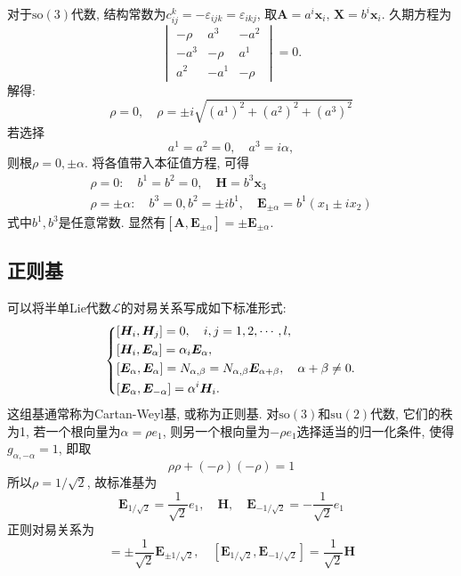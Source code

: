 \documentclass[UTF8]{ctexart}
\begin{document}
对于$\mathrm{so}(3)$代数, 结构常数为$c_{ij}^k = - \varepsilon_{ijk} = \varepsilon_{ikj}$, 取$\bm{A} = a^i \bm{x}_i,\, \bm{X} = b^i\bm{x}_i$. 久期方程为
\begin{equation}
  \begin{vmatrix}
    -\rho & a^3 & -a^2 \\
    -a^3 & -\rho & a^1 \\
    a^2 & -a^1 & -\rho
  \end{vmatrix} = 0.
\end{equation}
解得:
\begin{equation}
  \rho = 0, \quad \rho = \pm i \sqrt{(a^1)^2 + (a^2)^2 + (a^3)^2}
\end{equation}
若选择
\begin{equation}
  a^1 = a^2 = 0, \quad a^3 = i \alpha, 
\end{equation}
则根$\rho = 0, \pm \alpha$. 将各值带入本征值方程, 可得
\begin{gather}
  \rho = 0: \quad b^1 = b^2 = 0, \quad \bm{H} = b^3 \bm{x}_3 \\
  \rho = \pm \alpha: \quad b^3 = 0, b^2 = \pm i b^1, \quad \bm{E}_{\pm\alpha} = b^1(x_1\pm ix_2)
\end{gather}
式中$b^1, b^3$是任意常数. 显然有$[\bm{A}, \bm{E}_{\pm\alpha}] = \pm \bm{E}_{\pm\alpha}$.

\subsection{正则基}
可以将半单Lie代数$\mathcal{L}$的对易关系写成如下标准形式:
\begin{equation}
  \left\{
  \begin{lgathered}
    [\bm{H}_i, \bm{H}_j] = 0, \quad i,j = 1, 2, \cdots, l, \\
    [\bm{H}_i, \bm{E}_\alpha] = \alpha_i \bm{E}_\alpha,  \\
    [\bm{E}_\alpha, \bm{E}_\alpha] = N_{\alpha, \beta} = N_{\alpha, \beta} \bm{E}_{\alpha+\beta}, \quad \alpha + \beta \neq 0.\\
    [\bm{E}_\alpha , \bm{E}_{-\alpha}] = \alpha^i \bm{H}_i.
  \end{lgathered}
  \right.
\end{equation}
这组基通常称为Cartan-Weyl基, 或称为正则基. 对$\mathrm{so}(3)$和$\mathrm{su}(2)$代数, 它们的秩为1, 若一个根向量为$\alpha = \rho e_1$, 则另一个根向量为$-\rho e_1$选择适当的归一化条件, 使得$g_{\alpha, -\alpha} = 1$, 即取
\begin{equation}
  \rho \rho + (-\rho)(-\rho) = 1
\end{equation}
所以$\rho = 1/\sqrt{2}$, 故标准基为
\begin{equation}
  \bm{E}_{1/\sqrt{2}} = \frac{1}{\sqrt{2}} e_1, \quad \bm{H}, \quad \bm{E}_{-1/\sqrt{2}} = -\frac{1}{\sqrt{2}} e_1
\end{equation}
正则对易关系为
\begin{equation}
  [\bm{H}, \bm{E}_{\pm 1/\sqrt{2}}] = \pm \frac{1}{\sqrt{2}} \bm{E}_{\pm 1 /\sqrt{2}},\quad [\bm{E}_{1/\sqrt{2}}, \bm{E}_{- 1/\sqrt{2}}] = \frac{1}{\sqrt{2}} \bm{H}
\end{equation}
\end{document}
